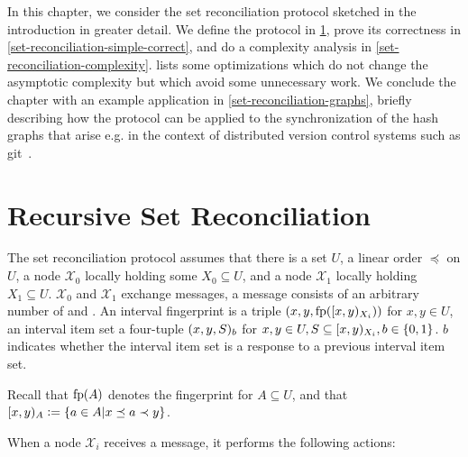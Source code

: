 
In this chapter, we consider the set reconciliation protocol sketched in the introduction in greater detail.
We define the protocol in \cref{set-reconciliation-def}, prove its correctness in \cref{set-reconciliation-simple-correct}, and do a complexity analysis in \cref{set-reconciliation-complexity}.   lists some optimizations which do not change the asymptotic complexity but which avoid some unnecessary work. We conclude the chapter with an example application in \cref{set-reconciliation-graphs}, briefly describing how the protocol can be applied to the synchronization of the hash graphs that arise e.g. in the context of distributed version control systems such as git~\cite{chacon2014pro}.

\section{Recursive Set Reconciliation}
\label{set-reconciliation-def}

The set reconciliation protocol assumes that there is a set $U$, a linear order $\preceq$ on $U$, a node $\mathcal{X}_0$ locally holding some $X_0 \subseteq U$, and a node $\mathcal{X}_1$ locally holding $X_1 \subseteq U$.
$\mathcal{X}_0$ and $\mathcal{X}_1$ exchange messages, a message consists of an arbitrary number of  and .
An interval fingerprint is a triple $({x}, {y}, {\operatorname{fp}([{x},{y})_{X_i})})$ for $x, y \in U$, an interval item set a four-tuple $({x}, {y}, {S})_{b}$ for $x, y \in U, S \subseteq [{x},{y})_{X_i}, b \in \{0, 1\}$. $b$ indicates whether the interval item set is a response to a previous interval item set.

Recall that $\operatorname{fp}(A)$ denotes the fingerprint for $A \subseteq U$, and that $[{x},{y})_{A} \vcentcolon= \{a \in A | x \preceq a \prec y\}$.

When a node $\mathcal{X}_i$ receives a message, it performs the following actions:

